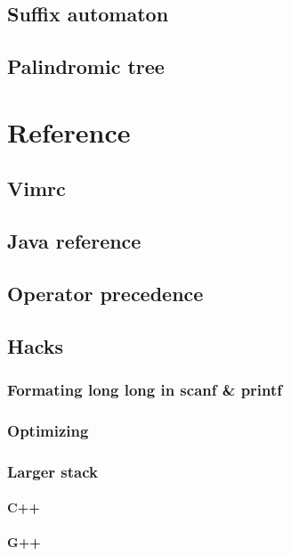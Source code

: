 \documentclass[UTF8,a4paper]{report}
\begin{document}
		\section{Suffix automaton}
			
		\section{Palindromic tree}
			
	\chapter{Reference}
		\section{Vimrc}
			
		\section{Java reference}
			
		\section{Operator precedence}
			
		\section{Hacks}
			\subsection{Formating long long in scanf \& printf}
				
			\subsection{Optimizing}
				
			\subsection{Larger stack}
				\subsubsection{C++}
					
				\subsubsection{G++}
					
\end{document}
